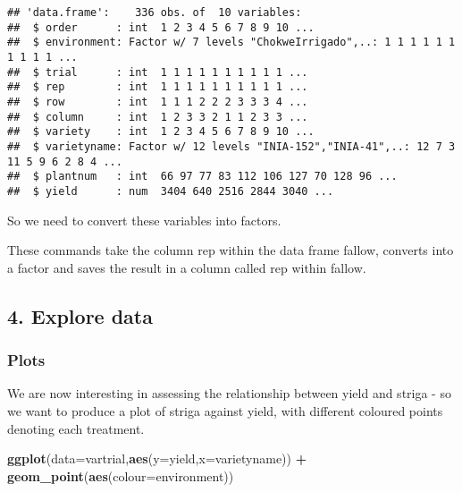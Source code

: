 \documentclass[]{book}
\newenvironment{Shaded}{\begin{snugshade}}{\end{snugshade}}
\newcommand{\KeywordTok}[1]{\textcolor[rgb]{0.13,0.29,0.53}{\textbf{#1}}}
\newcommand{\DataTypeTok}[1]{\textcolor[rgb]{0.13,0.29,0.53}{#1}}
\newcommand{\StringTok}[1]{\textcolor[rgb]{0.31,0.60,0.02}{#1}}
\newcommand{\OperatorTok}[1]{\textcolor[rgb]{0.81,0.36,0.00}{\textbf{#1}}}
\newcommand{\NormalTok}[1]{#1}
\theoremstyle{definition}
\theoremstyle{definition}
\theoremstyle{definition}
\theoremstyle{remark}
\begin{document}
\begin{verbatim}
## 'data.frame':    336 obs. of  10 variables:
##  $ order      : int  1 2 3 4 5 6 7 8 9 10 ...
##  $ environment: Factor w/ 7 levels "ChokweIrrigado",..: 1 1 1 1 1 1 1 1 1 1 ...
##  $ trial      : int  1 1 1 1 1 1 1 1 1 1 ...
##  $ rep        : int  1 1 1 1 1 1 1 1 1 1 ...
##  $ row        : int  1 1 1 2 2 2 3 3 3 4 ...
##  $ column     : int  1 2 3 3 2 1 1 2 3 3 ...
##  $ variety    : int  1 2 3 4 5 6 7 8 9 10 ...
##  $ varietyname: Factor w/ 12 levels "INIA-152","INIA-41",..: 12 7 3 11 5 9 6 2 8 4 ...
##  $ plantnum   : int  66 97 77 83 112 106 127 70 128 96 ...
##  $ yield      : num  3404 640 2516 2844 3040 ...
\end{verbatim}

So we need to convert these variables into factors.

\begin{Shaded}
\end{Shaded}

These commands take the column rep within the data frame fallow,
converts into a factor and saves the result in a column called rep
within fallow.

\subsection{4. Explore data}\label{explore-data-4}

\subsubsection{Plots}\label{plots-4}

We are now interesting in assessing the relationship between yield and
striga - so we want to produce a plot of striga against yield, with
different coloured points denoting each treatment.

\begin{Shaded}
\begin{Highlighting}[]
\KeywordTok{ggplot}\NormalTok{(}\DataTypeTok{data=}\NormalTok{vartrial,}\KeywordTok{aes}\NormalTok{(}\DataTypeTok{y=}\NormalTok{yield,}\DataTypeTok{x=}\NormalTok{varietyname)) }\OperatorTok{+}
\StringTok{  }\KeywordTok{geom_point}\NormalTok{(}\KeywordTok{aes}\NormalTok{(}\DataTypeTok{colour=}\NormalTok{environment))}
\end{Highlighting}
\end{Shaded}
\end{document}
